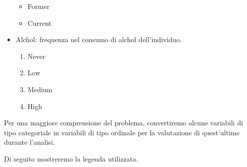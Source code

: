 \documentclass{article}\usepackage[]{graphicx}\usepackage[]{xcolor}
\begin{document}
\begin{itemize}
\begin{itemize}
          \item Former
          \item Current
        \end{itemize}
      \item Alchol: frequenza nel consumo di alchol dell'individuo.
        \begin{enumerate}
          \item Never 
          \item Low
          \item Medium
          \item High
        \end{enumerate}
    \end{itemize}
  
    Per una maggiore comprensione del problema, convertiremo alcune variabili di
    tipo categoriale in variabili di tipo ordinale per la valutazione di 
    quest'ultime durante l'analisi. \par
    Di seguito mostreremo la legenda utilizzata.
    
\end{document}
